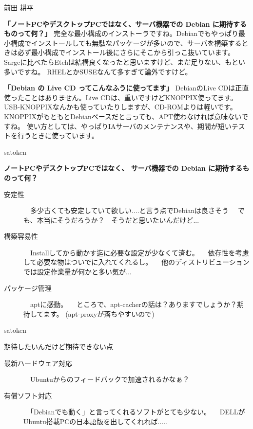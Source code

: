 \documentclass[cjk,dvipdfmx,12pt]{beamer}
\begin{document}
\begin{frame}{前田 耕平}

\textbf{「ノートPCやデスクトップPCではなく、サーバ機器での Debian に期待するものって何？」}
完全な最小構成のインストーラですね。Debianでもやっぱり最小構成でインストールしても無駄なパッケージが多いので、サーバを構築するときは必ず最小構成でインストール後にさらにそこから引っこ抜いています。
Sargeに比べたらEtchは結構良くなったと思いますけど、まだ足りない、もとい多いですね。
RHELとかSUSEなんて多すぎて論外ですけど。

\textbf{「Debian の Live CD ってこんなふうに使ってます」}
DebianのLive CDは正直使ったことはありません。Live CDは、重いですけどKNOPPIX使ってます。
USB-KNOPPIXなんかも使っていたりしますが、CD-ROMよりは軽いです。
KNOPPIXがもともとDebianベースだと言っても、APT使わなければ意味ないですね。
使い方としては、やっぱりIAサーバのメンテナンスや、期間が短いテストを行うときに使っています。

\end{frame}\begin{frame}{satoken}

\textbf{ノートPCやデスクトップPCではなく、
サーバ機器での Debian に期待するものって何？}

\begin{description}
 \item[安定性]
 　多少古くても安定していて欲しい....と言う点でDebianは良さそう
 　でも、本当にそうだろうか？　そうだと思いたいんだけど...

 \item[構築容易性]
 　Installしてから動かす迄に必要な設定が少なくて済む。
 　依存性を考慮して必要な物はついでに入れてくれるし。
 　他のディストリビューションでは設定作業量が何かと多い気が...

 \item[パッケージ管理]
 　aptに感動。
 　ところで、apt-cacherの話は？ありますでしょうか？期待してます。
 (apt-proxyが落ちやすいので)
\end{description}

\end{frame}\begin{frame}{satoken}

期待したいんだけど期待できない点

\begin{description}
 \item[最新ハードウェア対応]
 　Ubuntuからのフィードバックで加速されるかなぁ？

 \item[有償ソフト対応]
 　「Debianでも動く」と言ってくれるソフトがとても少ない。
 　DELLがUbuntu搭載PCの日本語版を出してくれれば.....
\end{description}



\end{frame}
\end{document}
